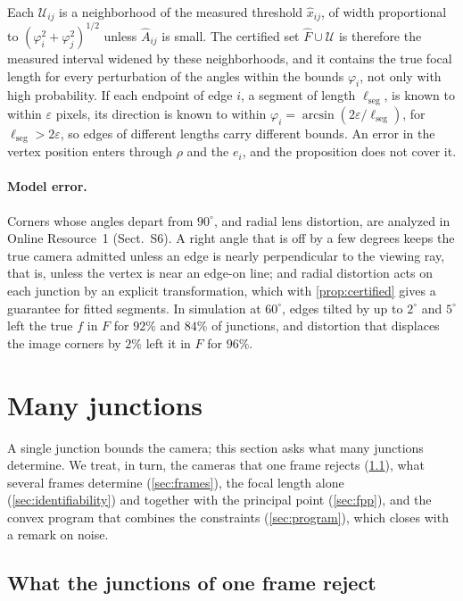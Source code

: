 \documentclass[pdflatex,sn-mathphys-num,iicol]{sn-jnl}
\newcommand{\OR}{Online Resource~1}
\theoremstyle{thmstyleone}
\theoremstyle{thmstylethree}
\theoremstyle{thmstyletwo}
\begin{document}
Each $\mathcal U_{ij}$ is a neighborhood of the measured threshold $\hat x_{ij}$, of width proportional to $(\varphi_i^2+\varphi_j^2)^{1/2}$ unless $\hat A_{ij}$ is small. The certified set $\hat F\cup\mathcal U$ is therefore the measured interval widened by these neighborhoods, and it contains the true focal length for every perturbation of the angles within the bounds $\varphi_i$, not only with high probability. If each endpoint of edge $i$, a segment of length $\ell_{\mathrm{seg}}$, is known to within $\varepsilon$ pixels, its direction is known to within $\varphi_i=\arcsin(2\varepsilon/\ell_{\mathrm{seg}})$, for $\ell_{\mathrm{seg}}>2\varepsilon$, so edges of different lengths carry different bounds. An error in the vertex position enters through $\rho$ and the $e_i$, and the proposition does not cover it.

\paragraph{Model error.} Corners whose angles depart from $90^\circ$, and radial lens distortion, are analyzed in \OR{} (Sect.~S6). A right angle that is off by a few degrees keeps the true camera admitted unless an edge is nearly perpendicular to the viewing ray, that is, unless the vertex is near an edge-on line; and radial distortion acts on each junction by an explicit transformation, which with \cref{prop:certified} gives a guarantee for fitted segments. In simulation at $60^\circ$, edges tilted by up to $2^\circ$ and $5^\circ$ left the true $f$ in $F$ for $92\%$ and $84\%$ of junctions, and distortion that displaces the image corners by $2\%$ left it in $F$ for $96\%$.

\section{Many junctions}\label{sec:many}

A single junction bounds the camera; this section asks what many junctions determine. We treat, in turn, the cameras that one frame rejects (\cref{sec:oneframe}), what several frames determine (\cref{sec:frames}), the focal length alone (\cref{sec:identifiability}) and together with the principal point (\cref{sec:fpp}), and the convex program that combines the constraints (\cref{sec:program}), which closes with a remark on noise.

\subsection{What the junctions of one frame reject}\label{sec:oneframe}
\end{document}
